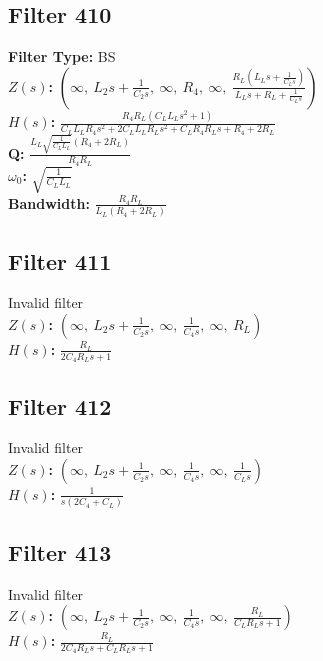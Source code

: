 \documentclass{article}
\begin{document}
\subsection*{Filter 410}
\textbf{Filter Type:} BS \\ 
\textbf{$Z(s)$:} $\left( \infty, \  L_{2} s + \frac{1}{C_{2} s}, \  \infty, \  R_{4}, \  \infty, \  \frac{R_{L} \left(L_{L} s + \frac{1}{C_{L} s}\right)}{L_{L} s + R_{L} + \frac{1}{C_{L} s}}\right)$ \\ 
\textbf{$H(s)$:} $\frac{R_{4} R_{L} \left(C_{L} L_{L} s^{2} + 1\right)}{C_{L} L_{L} R_{4} s^{2} + 2 C_{L} L_{L} R_{L} s^{2} + C_{L} R_{4} R_{L} s + R_{4} + 2 R_{L}}$ \\ 
\textbf{Q:} $\frac{L_{L} \sqrt{\frac{1}{C_{L} L_{L}}} \left(R_{4} + 2 R_{L}\right)}{R_{4} R_{L}}$ \\ 
\textbf{$\omega_0$:} $\sqrt{\frac{1}{C_{L} L_{L}}}$ \\ 
\textbf{Bandwidth:} $\frac{R_{4} R_{L}}{L_{L} \left(R_{4} + 2 R_{L}\right)}$ \\ 
\subsection*{Filter 411}
Invalid filter \\ 
\textbf{$Z(s)$:} $\left( \infty, \  L_{2} s + \frac{1}{C_{2} s}, \  \infty, \  \frac{1}{C_{4} s}, \  \infty, \  R_{L}\right)$ \\ 
\textbf{$H(s)$:} $\frac{R_{L}}{2 C_{4} R_{L} s + 1}$ \\ 
\subsection*{Filter 412}
Invalid filter \\ 
\textbf{$Z(s)$:} $\left( \infty, \  L_{2} s + \frac{1}{C_{2} s}, \  \infty, \  \frac{1}{C_{4} s}, \  \infty, \  \frac{1}{C_{L} s}\right)$ \\ 
\textbf{$H(s)$:} $\frac{1}{s \left(2 C_{4} + C_{L}\right)}$ \\ 
\subsection*{Filter 413}
Invalid filter \\ 
\textbf{$Z(s)$:} $\left( \infty, \  L_{2} s + \frac{1}{C_{2} s}, \  \infty, \  \frac{1}{C_{4} s}, \  \infty, \  \frac{R_{L}}{C_{L} R_{L} s + 1}\right)$ \\ 
\textbf{$H(s)$:} $\frac{R_{L}}{2 C_{4} R_{L} s + C_{L} R_{L} s + 1}$ \\ 
\end{document}
